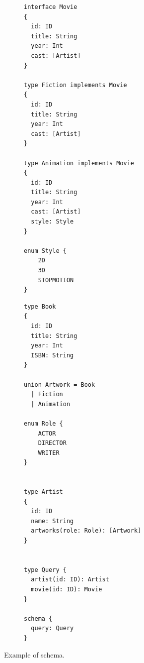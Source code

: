 \begin{figure}
    \centering
    \begin{subfigure}{.5\linewidth}
    
    \begin{verbatim}
interface Movie
{
  id: ID		
  title: String
  year: Int
  cast: [Artist]
}

type Fiction implements Movie
{
  id: ID		
  title: String
  year: Int
  cast: [Artist]
}

type Animation implements Movie
{
  id: ID		
  title: String
  year: Int
  cast: [Artist]
  style: Style
}

enum Style {
	2D
	3D
	STOPMOTION
}
    \end{verbatim}
    \end{subfigure}%
    \begin{subfigure}{.5\linewidth}
    \begin{verbatim}
type Book
{
  id: ID
  title: String
  year: Int
  ISBN: String
}

union Artwork = Book
  | Fiction
  | Animation 
  
enum Role { 
	ACTOR
	DIRECTOR
	WRITER
}


type Artist
{
  id: ID
  name: String
  artworks(role: Role): [Artwork]
}


type Query {
  artist(id: ID): Artist
  movie(id: ID): Movie
}

schema {
  query: Query
}
    \end{verbatim}
    \end{subfigure}
    
    \caption{Example of \gql schema.}
    \label{fig:schema_ex}
\end{figure}

